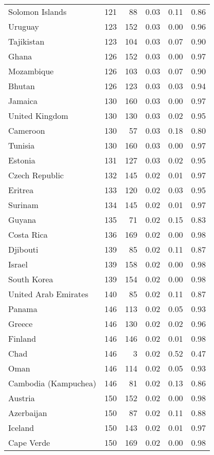 \begin{longtable}[t]{lrrrrr}
\addlinespace
Solomon Islands & 121 & 88 & 0.03 & 0.11 & 0.86\\
Uruguay & 123 & 152 & 0.03 & 0.00 & 0.96\\
Tajikistan & 123 & 104 & 0.03 & 0.07 & 0.90\\
Ghana & 126 & 152 & 0.03 & 0.00 & 0.97\\
Mozambique & 126 & 103 & 0.03 & 0.07 & 0.90\\
\addlinespace
Bhutan & 126 & 123 & 0.03 & 0.03 & 0.94\\
Jamaica & 130 & 160 & 0.03 & 0.00 & 0.97\\
United Kingdom & 130 & 130 & 0.03 & 0.02 & 0.95\\
Cameroon & 130 & 57 & 0.03 & 0.18 & 0.80\\
Tunisia & 130 & 160 & 0.03 & 0.00 & 0.97\\
\addlinespace
Estonia & 131 & 127 & 0.03 & 0.02 & 0.95\\
Czech Republic & 132 & 145 & 0.02 & 0.01 & 0.97\\
Eritrea & 133 & 120 & 0.02 & 0.03 & 0.95\\
Surinam & 134 & 145 & 0.02 & 0.01 & 0.97\\
Guyana & 135 & 71 & 0.02 & 0.15 & 0.83\\
\addlinespace
Costa Rica & 136 & 169 & 0.02 & 0.00 & 0.98\\
Djibouti & 139 & 85 & 0.02 & 0.11 & 0.87\\
Israel & 139 & 158 & 0.02 & 0.00 & 0.98\\
South Korea & 139 & 154 & 0.02 & 0.00 & 0.98\\
United Arab Emirates & 140 & 85 & 0.02 & 0.11 & 0.87\\
\addlinespace
Panama & 146 & 113 & 0.02 & 0.05 & 0.93\\
Greece & 146 & 130 & 0.02 & 0.02 & 0.96\\
Finland & 146 & 146 & 0.02 & 0.01 & 0.98\\
Chad & 146 & 3 & 0.02 & 0.52 & 0.47\\
Oman & 146 & 114 & 0.02 & 0.05 & 0.93\\
\addlinespace
Cambodia (Kampuchea) & 146 & 81 & 0.02 & 0.13 & 0.86\\
Austria & 150 & 152 & 0.02 & 0.00 & 0.98\\
Azerbaijan & 150 & 87 & 0.02 & 0.11 & 0.88\\
Iceland & 150 & 143 & 0.02 & 0.01 & 0.97\\
Cape Verde & 150 & 169 & 0.02 & 0.00 & 0.98\\

\end{longtable}
